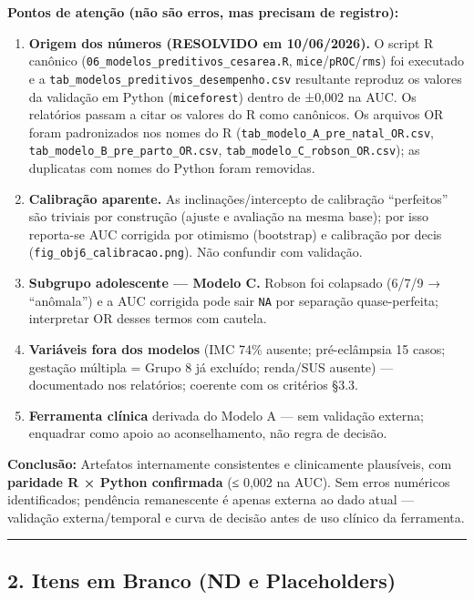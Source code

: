 \documentclass[
]{article}
\providecommand{\tightlist}{%
  \setlength{\itemsep}{0pt}\setlength{\parskip}{0pt}}
\begin{document}
\textbf{Pontos de atenção (não são erros, mas precisam de registro):}

\begin{enumerate}
\def\labelenumi{\arabic{enumi}.}
\tightlist
\item
  \textbf{Origem dos números (RESOLVIDO em 10/06/2026).} O script R
  canônico (\texttt{06\_modelos\_preditivos\_cesarea.R},
  \texttt{mice}/\texttt{pROC}/\texttt{rms}) foi executado e a
  \texttt{tab\_modelos\_preditivos\_desempenho.csv} resultante reproduz
  os valores da validação em Python (\texttt{miceforest}) dentro de
  ±0,002 na AUC. Os relatórios passam a citar os valores do R como
  canônicos. Os arquivos OR foram padronizados nos nomes do R
  (\texttt{tab\_modelo\_A\_pre\_natal\_OR.csv},
  \texttt{tab\_modelo\_B\_pre\_parto\_OR.csv},
  \texttt{tab\_modelo\_C\_robson\_OR.csv}); as duplicatas com nomes do
  Python foram removidas.
\item
  \textbf{Calibração aparente.} As inclinações/intercepto de calibração
  ``perfeitos'' são triviais por construção (ajuste e avaliação na mesma
  base); por isso reporta-se AUC corrigida por otimismo (bootstrap) e
  calibração por decis (\texttt{fig\_obj6\_calibracao.png}). Não
  confundir com validação.
\item
  \textbf{Subgrupo adolescente --- Modelo C.} Robson foi colapsado
  (6/7/9 → ``anômala'') e a AUC corrigida pode sair \texttt{NA} por
  separação quase-perfeita; interpretar OR desses termos com cautela.
\item
  \textbf{Variáveis fora dos modelos} (IMC 74\% ausente; pré-eclâmpsia
  15 casos; gestação múltipla = Grupo 8 já excluído; renda/SUS ausente)
  --- documentado nos relatórios; coerente com os critérios §3.3.
\item
  \textbf{Ferramenta clínica} derivada do Modelo A --- sem validação
  externa; enquadrar como apoio ao aconselhamento, não regra de decisão.
\end{enumerate}

\textbf{Conclusão:} Artefatos internamente consistentes e clinicamente
plausíveis, com \textbf{paridade R × Python confirmada} (≤ 0,002 na
AUC). Sem erros numéricos identificados; pendência remanescente é apenas
externa ao dado atual --- validação externa/temporal e curva de decisão
antes de uso clínico da ferramenta.

\begin{center}\rule{0.5\linewidth}{0.5pt}\end{center}

\hypertarget{itens-em-branco-nd-e-placeholders}{%
\subsection{2. Itens em Branco (ND e
Placeholders)}\label{itens-em-branco-nd-e-placeholders}}
\end{document}
